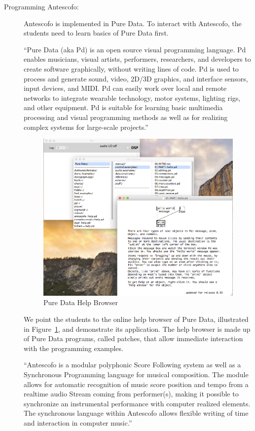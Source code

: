 \documentclass[onecolumn,nocopyrightspace,preprint]{sigplanconf}
\begin{document}
\begin{description}
\item[Programming Antescofo:] Antescofo is implemented in Pure Data. To
interact with Antescofo, the students need to learn basics of Pure Data first.

``Pure Data (aka Pd) is an open source visual programming language. Pd enables
musicians, visual artists, performers, researchers, and developers to create
software graphically, without writing lines of code. Pd is used to process
and generate sound, video, 2D/3D graphics, and interface sensors, input
devices, and MIDI. Pd can easily work over local and remote networks to
integrate wearable technology, motor systems, lighting rigs, and other
equipment. Pd is suitable for learning basic multimedia processing and
visual programming methods as well as for realizing complex systems for
large-scale projects.''~\cite{website:puredata}

\begin{figure}[t]
    \centering
    \includegraphics[scale=0.4]{fig/pd-help-browser.png}
    \caption{Pure Data Help Browser}
    \label{fig:pd-help-browser}
\end{figure}

We point the students to the online help browser of Pure Data, illustrated in
Figure~\ref{fig:pd-help-browser}, and demonstrate its application. The help
browser is made up of Pure Data programs, called patches, that allow immediate
interaction with the programming examples.

``Antescofo is a modular polyphonic Score Following system as well as a
Synchronous Programming language for musical composition. The module allows
for automatic recognition of music score position and tempo from a realtime
audio Stream coming from performer(s), making it possible to synchronize an
instrumental performance with computer realized elements. The synchronous
language within Antescofo allows flexible writing of time and interaction in
computer music.''~\cite{website:antescofo}


\end{description}
\end{document}
